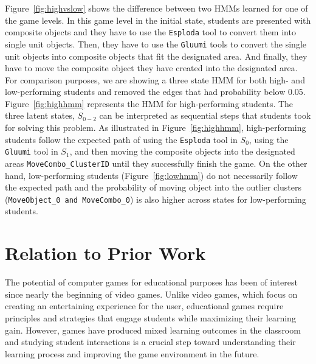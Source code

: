 \documentclass{sigchi}
\begin{document}
	Figure~\ref{fig:highvslow} shows the difference between two HMMs learned for one of the game levels.
	In this game level in the initial state, students are presented with composite objects and they have to use the \texttt{Esploda} tool to convert them into single unit objects. 
	Then, they have to use the \texttt{Gluumi} tools to convert the single unit objects into composite objects that fit the designated area. 
	And finally, they have to move the composite object they have created into the designated area.
	For comparison purposes, we are showing a three state HMM for both high- and low-performing students and removed the edges that had probability below 0.05. 
	Figure~\ref{fig:highhmm} represents the HMM for high-performing students. 
	The three latent states, $S_{0-2}$ can be interpreted as sequential steps that students took for solving this problem. As illustrated in Figure~\ref{fig:highhmm}, high-performing students follow the expected path of using the \texttt{Esploda} tool in $S_0$, using the \texttt{Gluumi} tool in $S_1$, and then moving the composite objects into the designated areas \texttt{MoveCombo\_{ClusterID}} until they successfully finish the game.
	On the other hand, low-performing students (Figure~\ref{fig:lowhmm}) do not necessarily follow the expected path and the probability of moving object into the outlier clusters (\texttt{MoveObject\_0 and MoveCombo\_0}) is also higher across states for low-performing students.
	
	\section{Relation to Prior Work}
	\label{sec:priorwork}
	The potential of computer games for educational purposes has been of interest since nearly the beginning of video games. 
	Unlike video games, which focus on creating an entertaining experience for the user, educational games require principles and strategies that engage students while maximizing their learning gain. 
	However, games have produced mixed learning outcomes in the classroom \cite{harpstead2013search,mayo2009video} and studying student interactions is a crucial step toward understanding their learning process and improving the game environment in the future.
	
\end{document}
